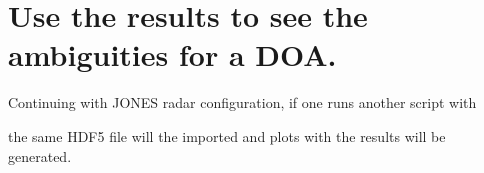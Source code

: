 \documentclass[letterpaper,12pt,english]{sphinxmanual}
\begin{document}
\section{Use the results to see the ambiguities for a DOA.}
\label{\detokenize{test_example:use-the-results-to-see-the-ambiguities-for-a-doa}}
Continuing with JONES radar configuration, if one runs another script with

%
\begin{sphinxVerbatim}[commandchars=\\\{\}]
   

   
\end{sphinxVerbatim}

the same HDF5 file will the imported and plots with the results will be generated.

\begin{figure}[htbp]
\centering

\noindent{}
\end{figure}

\begin{figure}[htbp]
\centering

\noindent{}
\end{figure}

\begin{figure}[htbp]
\centering

\noindent{}
\end{figure}

\begin{figure}[htbp]
\centering

\noindent{}
\end{figure}

\begin{figure}[htbp]
\centering

\noindent{}
\end{figure}

\begin{figure}[htbp]
\centering

\noindent{}
\end{figure}
\end{document}
